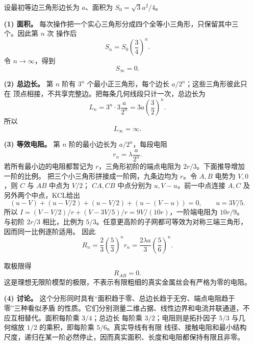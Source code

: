 \begin{xesolution}
设最初等边三角形边长为 $a$、面积为 $S_0=\sqrt3a^2/4$。

\textbf{(1) 面积。} 每次操作把一个实心三角形分成四个全等小三角形，只保留其中三个。因此第 $n$ 次
操作后
\[
  S_n=S_0\left(\frac34\right)^n.
\]
令 $n\to\infty$，得到
\[
  \boxed{S_\infty=0}.
\]

\textbf{(2) 总边长。} 第 $n$ 阶有 $3^n$ 个最小正三角形，每个边长 $a/2^n$；这些三角形彼此只在
顶点相接，不共享完整边。把每条几何线段只计一次，总边长为
\[
  L_n=3^n\cdot3\frac{a}{2^n}
  =3a\left(\frac32\right)^n.
\]
所以
\[
  \boxed{L_\infty=\infty}.
\]

\textbf{(3) 等效电阻。} 第 $n$ 阶的最小边长为 $a/2^n$，每段电阻
\[
  r_n=\lambda\frac{a}{2^n}.
\]
若所有最小边的电阻都暂记为 $r$，三角形初阶的端点电阻为 $2r/3$。下面推导增加一阶的比例。
把三个小三角形拼接成一阶网，九条边均为 $r$。令 $A,B$ 电势为 $V,0$，则 $C$ 与 $AB$ 中点为 $V/2$；
$CA,CB$ 中点分别为 $u,V-u$。前一中点连接 $A,C$ 及另外两个中点，KCL给出
\[
 (u-V)+(u-V/2)+(u-V/2)+(u-(V-u))=0,
 \qquad u=3V/5.
\]
所以 $I=(V-V/2)/r+(V-3V/5)/r=9V/(10r)$，一阶端电阻为 $10r/9$。
与初阶 $2r/3$ 相比，比例为 $5/3$。任意更高阶的子网都可等效为对称三端三角形，因而同一比例逐阶适用。
因此
\[
  R_n=\frac23\left(\frac53\right)^n r_n
  =\frac{2\lambda a}{3}\left(\frac56\right)^n.
\]

\sierpinskiResistanceFigure
{}

取极限得
\[
  \boxed{R_{AB}=0}.
\]
这是理想无限阶模型的极限，不表示有限粗细的真实金属丝会有严格为零的电阻。

\textbf{(4) 讨论。} 这个分形同时具有“面积趋于零、总边长趋于无穷、端点电阻趋于零”三种看似矛盾
的性质。它们分别测量二维占据、线性边界和电流并联通道，不应互相替代。面积每阶乘 $3/4$；总边长
每阶乘 $3/2$；电阻则是拓扑因子 $5/3$ 与几何缩放 $1/2$ 的乘积，即每阶乘 $5/6$。真实导线有有限
线径、接触电阻和最小结构尺度，递归在某一阶必然停止，因而真实面积、长度和电阻都保持有限且非零。
\end{xesolution}

